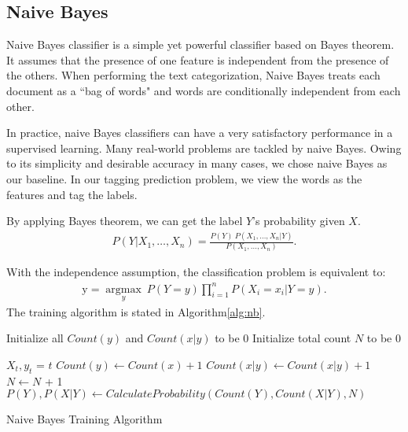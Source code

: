 
\subsection{Naive Bayes}
Naive Bayes classifier is a simple yet powerful classifier based on Bayes theorem. It assumes that the presence of one feature is independent from the presence of the others. When performing the text categorization, Naive Bayes treats each document as a ``bag of words" and words are conditionally independent from each other.

In practice, naive Bayes classifiers can have a very satisfactory performance in a supervised learning. Many real-world problems are tackled by naive Bayes. Owing to its simplicity and desirable accuracy in many cases, we chose naive Bayes as our baseline. In our tagging prediction problem, we view the words as the features and tag the labels.

By applying Bayes theorem, we can get the label $Y$'s probability given $X$.
\begin{gather}
    P(Y \vert X_1,\dots,X_n) = \frac{P(Y) \ P(X_1,\dots,X_n\vert Y)}{P(X_1,\dots,X_n)}. 
\end{gather}

With the independence assumption, the classification problem is equivalent to:
\begin{gather}
    \mathrm{y} = \underset{y}{\operatorname{argmax}} \ P(Y=y) \displaystyle\prod_{i=1}^n P(X_i=x_i\vert Y=y).
\end{gather}
The training algorithm is stated in Algorithm\ref{alg:nb}.

\IncMargin{1em}
\begin{algorithm}
\label{alg:nb}
\BlankLine
Initialize all $Count(y)$ and $Count(x|y)$ to be 0\;
Initialize total count $N$ to be 0\;

 {
    $X_t, y_t$ = $t$\;
     {
        $Count(y) \leftarrow Count(x) + 1$ \;
        $Count(x|y) \leftarrow Count(x|y) + 1$ \;
        $N \leftarrow N$ + 1 \;
    }
}
\Return $P(Y), P(X|Y) \leftarrow CalculateProbability(Count(Y), Count(X|Y), N)$

\caption{Naive Bayes Training Algorithm}\label{algo_disjdecomp}
\end{algorithm}
\DecMargin{1em}


